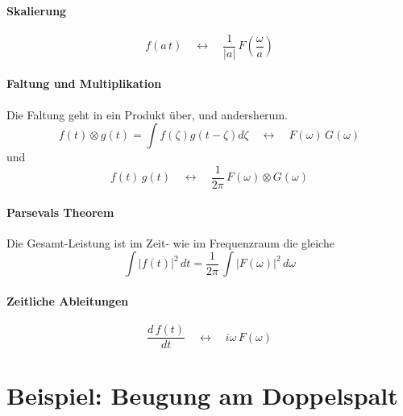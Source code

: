 \paragraph{Skalierung}  
\begin{equation}
 f( a \, t)  \quad \leftrightarrow \quad 
\frac{1}{|a|} \, F \left( \frac{\omega}{a} \right)  
\end{equation}


\paragraph{Faltung und Multiplikation} Die Faltung geht in ein Produkt über, und andersherum.
\begin{equation}
 f(t) \otimes g(t) = \int f(\zeta) g(t- \zeta) d\zeta 
 \quad \leftrightarrow \quad 
 F(\omega) \, G(\omega)
\end{equation}
und
\begin{equation}
 f(t) \,  g(t) 
 \quad \leftrightarrow \quad 
\frac{1}{2 \pi} \,  F(\omega) \otimes G(\omega)
\end{equation}

\paragraph{Parsevals Theorem} Die Gesamt-Leistung ist im Zeit- wie im Frequenzraum die gleiche
\begin{equation}
 \int |f(t) |^2 \, dt = \frac{1}{2 \pi} \, \int | F (\omega ) | ^2 \, d\omega
\end{equation}

\paragraph{Zeitliche Ableitungen}
\begin{equation}
 \frac{d \, f(t)}{dt} 
 \quad \leftrightarrow \quad 
i \omega \,  F(\omega) 
\end{equation}



\section{Beispiel: Beugung am Doppelspalt}

